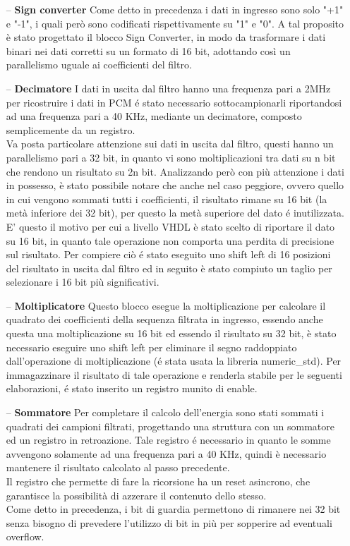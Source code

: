 \documentclass[a4paper, titlepage]{article}
\begin{document}
\begin{itemize}
    \item [--] \textbf{Sign converter}
    \newline
    Come detto in precedenza i dati in ingresso sono solo "+1" e "-1", i quali però sono codificati rispettivamente su "1" e "0". A tal proposito è stato progettato il blocco Sign Converter, in modo da trasformare i dati binari nei dati corretti su un formato di 16 bit, adottando così un parallelismo uguale ai coefficienti del filtro.
    \item [--] \textbf{Decimatore}
    \newline
    I dati in uscita dal filtro hanno una frequenza pari a 2MHz per ricostruire i dati in PCM é stato necessario sottocampionarli riportandosi ad una frequenza pari a 40 KHz, mediante un decimatore, composto semplicemente da un registro.\\Va posta particolare attenzione sui dati in uscita dal filtro, questi hanno un parallelismo pari a 32 bit, in quanto vi sono moltiplicazioni tra dati su n bit che rendono un risultato su 2n bit. Analizzando però con più attenzione i dati in possesso, è stato possibile notare che anche nel caso peggiore, ovvero quello in cui vengono sommati tutti i coefficienti, il risultato rimane su 16 bit (la metà inferiore dei 32 bit), per questo la metà superiore del dato é inutilizzata. E' questo il motivo per cui a livello VHDL è stato scelto di riportare il dato su 16 bit, in quanto tale operazione non comporta una perdita di precisione sul risultato. Per compiere ciò é stato eseguito uno shift left di 16 posizioni del risultato in uscita dal filtro ed in seguito è stato compiuto un taglio per selezionare i 16 bit più significativi.
    \item [--] \textbf{Moltiplicatore}
    \newline
    Questo blocco esegue la moltiplicazione per calcolare il quadrato dei coefficienti della sequenza filtrata in ingresso, essendo anche questa una moltiplicazione su 16 bit ed essendo il risultato su 32 bit, è stato necessario eseguire uno shift left per eliminare il segno raddoppiato dall'operazione di moltiplicazione (é stata usata la libreria numeric\_std).
    \newline 
    Per immagazzinare il risultato di tale operazione e renderla stabile per le seguenti elaborazioni, é stato inserito un registro munito di enable.
    \item [--] \textbf{Sommatore}
    \newline
    Per completare il calcolo dell'energia sono stati sommati i quadrati dei campioni filtrati, progettando una struttura con un sommatore ed un registro in retroazione. Tale registro é necessario in quanto le somme avvengono solamente ad una frequenza pari a
    40 KHz, quindi è necessario mantenere il risultato calcolato al passo precedente.\\ Il registro che permette di fare la ricorsione ha un reset asincrono, che garantisce la possibilità di azzerare il contenuto dello stesso.\\ Come detto in precedenza, i bit di guardia permettono di rimanere nei 32 bit senza bisogno di prevedere l'utilizzo di bit in più per sopperire ad eventuali overflow.
    

\end{itemize}
\end{document}

